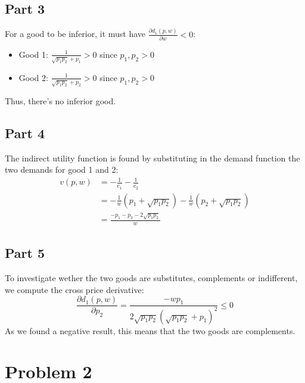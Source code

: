\documentclass[12pt]{extarticle}
\numberwithin{table}{section}
\numberwithin{figure}{section}
\numberwithin{equation}{section}
\begin{document}
\subsection*{Part 3}
For a good to be inferior, it must have $\frac{\partial d_1(p,w)}{\partial w}<0$:
\begin{itemize}
    \item
          Good 1: $\frac{1}{\sqrt{p_1p_2}+p_1}>0$ since $p_1,p_2>0$
    \item
          Good 2: $\frac{1}{\sqrt{p_1p_2}+p_2}>0$ since $p_1,p_2>0$
\end{itemize}
Thus, there's no inferior good.

\subsection*{Part 4}
The indirect utility function is found by substituting in the demand function the two demands for good 1 and 2:
\begin{align}
    v(p,w) & = -\frac{1}{c_1}-\frac{1}{c_2}                                   \\
           & = -\frac{1}{w}(p_1+\sqrt{p_1p_2})-\frac{1}{w}(p_2+\sqrt{p_1p_2}) \\
           & = \frac{-p_1-p_2-2\sqrt{p_1p_2}}{w}
\end{align}

\subsection*{Part 5}
To investigate wether the two goods are substitutes, complements or indifferent, we compute the cross price derivative:
\begin{equation}
    \frac{\partial d_1(p,w)}{\partial p_2}= \frac{-wp_1}{2\sqrt{p_1p_2}(\sqrt{p_1p_2}+p_1)^2}\le 0
\end{equation}
As we found a negative result, this means that the two goods are complements.

\section*{Problem 2}
\end{document}
